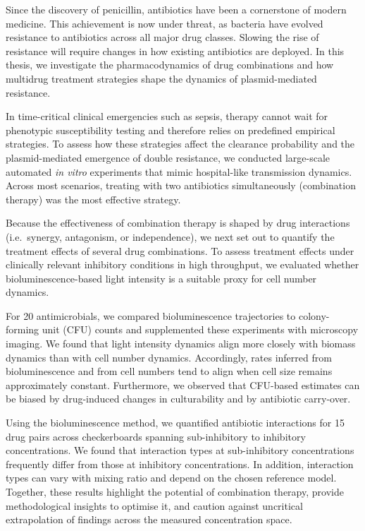 Since the discovery of penicillin, antibiotics have been a cornerstone of modern medicine.
This achievement is now under threat, as bacteria have evolved resistance to antibiotics across all major drug classes.
Slowing the rise of resistance will require changes in how existing antibiotics are deployed.
In this thesis, we investigate the pharmacodynamics of drug combinations and how multidrug treatment strategies shape the dynamics of plasmid-mediated resistance.

In time-critical clinical emergencies such as sepsis, therapy cannot wait for phenotypic susceptibility testing and therefore relies on predefined empirical strategies.
To assess how these strategies affect the clearance probability and the plasmid-mediated emergence of double resistance, we conducted large-scale automated \textit{in vitro} experiments that mimic hospital-like transmission dynamics.
Across most scenarios, treating with two antibiotics simultaneously (combination therapy) was the most effective strategy.

Because the effectiveness of combination therapy is shaped by drug interactions (i.e.\ synergy, antagonism, or independence), we next set out to quantify the treatment effects of several drug combinations.
To assess treatment effects under clinically relevant inhibitory conditions in high throughput, we evaluated whether bioluminescence-based light intensity is a suitable proxy for cell number dynamics.

For 20 antimicrobials, we compared bioluminescence trajectories to colony-forming unit (CFU) counts and supplemented these experiments with microscopy imaging.
We found that light intensity dynamics align more closely with biomass dynamics than with cell number dynamics.
Accordingly, rates inferred from bioluminescence and from cell numbers tend to align when cell size remains approximately constant.
Furthermore, we observed that CFU-based estimates can be biased by drug-induced changes in culturability and by antibiotic carry-over.

Using the bioluminescence method, we quantified antibiotic interactions for 15 drug pairs across checkerboards spanning sub-inhibitory to inhibitory concentrations.
We found that interaction types at sub-inhibitory concentrations frequently differ from those at inhibitory concentrations.
In addition, interaction types can vary with mixing ratio and depend on the chosen reference model.
Together, these results highlight the potential of combination therapy, provide methodological insights to optimise it, and caution against uncritical extrapolation of findings across the measured concentration space.
